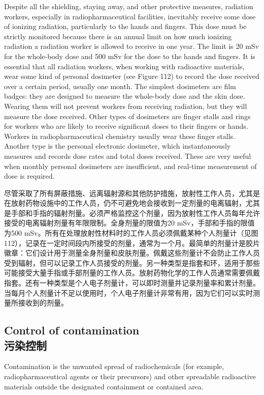 \documentclass[dvipsnames, svgnames,a4paper,11pt]{article}
\begin{document}
Despite all the shielding, staying away, and other protective measures, radiation workers, especially in radiopharmaceutical facilities, inevitably receive some dose of ionizing radiation, particularly to the hands and fingers. This dose must be strictly monitored because there is an annual limit on how much ionizing radiation a radiation worker is allowed to receive in one year. The limit is 20 mSv for the whole-body dose and 500 mSv for the dose to the hands and fingers. It is essential that all radiation workers, when working with radioactive materials, wear some kind of personal dosimeter (see Figure 112) to record the dose received over a certain period, usually one month. The simplest dosimeters are film badges: they are designed to measure the whole-body dose and the skin dose. Wearing them will not prevent workers from receiving radiation, but they will measure the dose received. Other types of dosimeters are finger stalls and rings for workers who are likely to receive significant doses to their fingers or hands. Workers in radiopharmaceutical chemistry usually wear these finger stalls. Another type is the personal electronic dosimeter, which instantaneously measures and records dose rates and total doses received. These are very useful when monthly personal dosimeters are insufficient, and real-time measurement of dose is required.

尽管采取了所有屏蔽措施、远离辐射源和其他防护措施，放射性工作人员，尤其是在放射药物设施中的工作人员，仍不可避免地会接收到一定剂量的电离辐射，尤其是手部和手指的辐射剂量。必须严格监控这个剂量，因为放射性工作人员每年允许接受的电离辐射剂量有年限限制。全身剂量的限值为20 mSv，手部和手指的限值为500 mSv。所有在处理放射性材料时的工作人员必须佩戴某种个人剂量计（见图112），记录在一定时间段内所接受的剂量，通常为一个月。最简单的剂量计是胶片徽章：它们设计用于测量全身剂量和皮肤剂量。佩戴这些剂量计不会防止工作人员受到辐射，但可以记录工作人员接受的剂量。另一种类型是指套和环，适用于那些可能接受大量手指或手部剂量的工作人员。放射药物化学的工作人员通常需要佩戴指套。还有一种类型是个人电子剂量计，可以即时测量并记录剂量率和累计剂量。当每月个人剂量计不足以使用时，个人电子剂量计非常有用，因为它们可以实时测量所接收到的剂量。

\subsection{Control of contamination \\污染控制}  

Contamination is the unwanted spread of radiochemicals (for example, radiopharmaceutical agents or their precursors) and other spreadable radioactive materials outside the designated containment or contained area.
\end{document}
